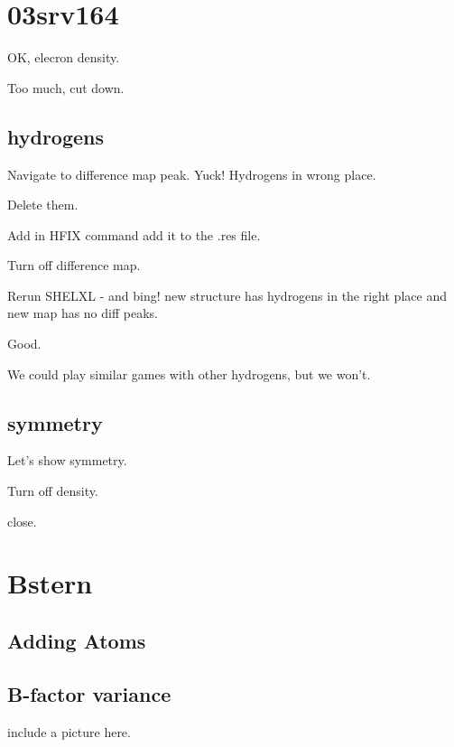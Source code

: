 \documentclass{article}
\begin{document}
\section{03srv164}

OK, elecron density.

Too much, cut down.

\subsection{hydrogens}
Navigate to difference map peak.  Yuck! Hydrogens in wrong place.

Delete them.

Add in HFIX command add it to the .res file.

Turn off difference map.

Rerun SHELXL - and bing! new structure has hydrogens in the right
place and new map has no diff peaks.

Good.

We could play similar games with other hydrogens, but we won't.

\subsection{symmetry}

Let's show symmetry.

Turn off density.


close.


\section{Bstern}

\subsection{Adding Atoms}


\subsection{B-factor variance}

include a picture here.
\end{document}
